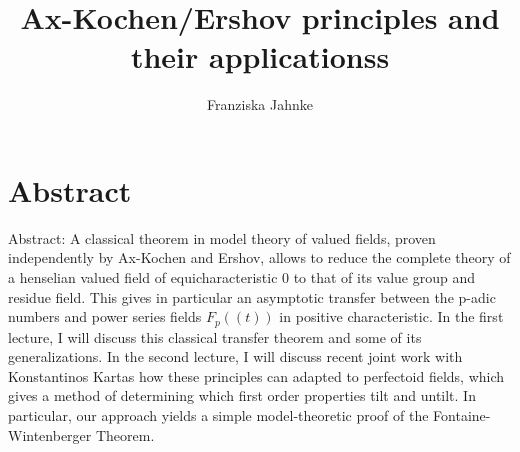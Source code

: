 \documentclass[11pt]{amsart}
\title{
Ax-Kochen/Ershov principles and their applicationss}
\author{Franziska Jahnke}
\begin{document}
\maketitle

\section*{Abstract}


Abstract: A classical theorem in model theory of valued fields, proven
independently by Ax-Kochen and Ershov, allows to reduce the complete
theory of a henselian valued field of equicharacteristic $0$ to that of
its value group and residue field. This gives in particular an
asymptotic transfer between the p-adic numbers and power series fields
$F_p((t))$ in positive characteristic. In the first lecture, I will
discuss this classical transfer theorem and some of its generalizations.
In the second lecture, I will discuss recent joint work with
Konstantinos Kartas how these principles can adapted to perfectoid
fields, which gives a method of determining which first order properties
tilt and untilt. In particular, our approach yields a simple
model-theoretic proof of the Fontaine-Wintenberger Theorem.
\end{document}

